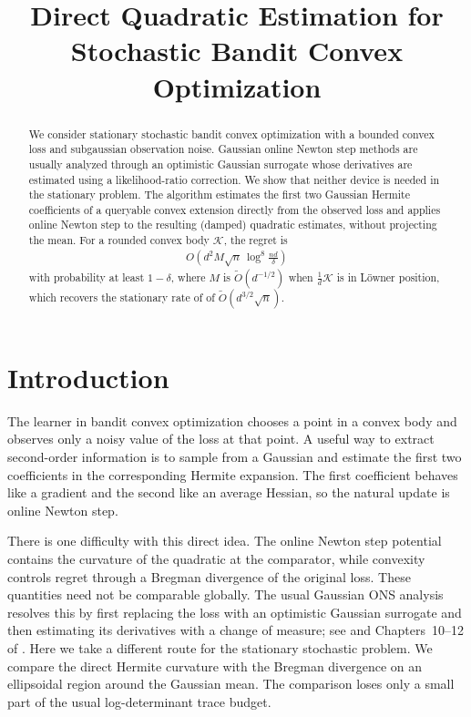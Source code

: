 \documentclass{article}
\title{Direct Quadratic Estimation for Stochastic Bandit Convex Optimization}
\author{\qquad}
\date{}
\newcommand{\K}{\mathcal K}
\newcommand{\1}{\mathbf 1}
\begin{document}
\maketitle

\begin{abstract}
    We consider stationary stochastic bandit convex optimization with a bounded
    convex loss and subgaussian observation noise.  Gaussian online Newton step
    methods are usually analyzed through an optimistic Gaussian surrogate whose
    derivatives are estimated using a likelihood-ratio correction.  We show that
    neither device is needed in the stationary problem.  The algorithm estimates
    the first two Gaussian Hermite coefficients of a queryable convex extension
    directly from the observed loss and applies online Newton step to the resulting
    (damped) quadratic estimates, without projecting the mean.
    For a rounded convex body $\K$, the regret is
    \begin{align}
        O\!\left(d^2 M\sqrt n\,
        \log^8\!\frac{nd}{\delta}\right)
    \end{align}
    with probability at least $1-\delta$, where $M$ is $\tilde{O}(d^{-1/2})$
    when $\frac1d \K$ is in L\"owner position,
    which recovers the stationary rate of \citet{fokkema2024online}
    of $\widetilde O(d^{3/2}\sqrt n)$.
\end{abstract}

\section{Introduction}

The learner in bandit convex optimization chooses a point in a convex body
and observes only a noisy value of the loss at that point.  A useful way to
extract second-order information is to sample from a Gaussian and estimate the
first two coefficients in the corresponding Hermite expansion.  The first
coefficient behaves like a gradient and the second like an average Hessian, so
the natural update is online Newton step.

There is one difficulty with this direct idea.  The online Newton step
potential contains the curvature of the quadratic at the comparator, while
convexity controls regret through a Bregman divergence of the original loss.
These quantities need not be comparable globally.  The usual Gaussian ONS
analysis resolves this by first replacing the loss with an optimistic
Gaussian surrogate and then estimating its derivatives with a change of
measure; see \citet{lattimore2023second} and Chapters~10--12 of
\citet{lattimore2026bandit}.  Here we take a
different route for the stationary stochastic problem.  We compare the direct
Hermite curvature with the Bregman divergence on an ellipsoidal region around
the Gaussian mean.  The comparison loses only a small part of the usual
log-determinant trace budget.
\end{document}
